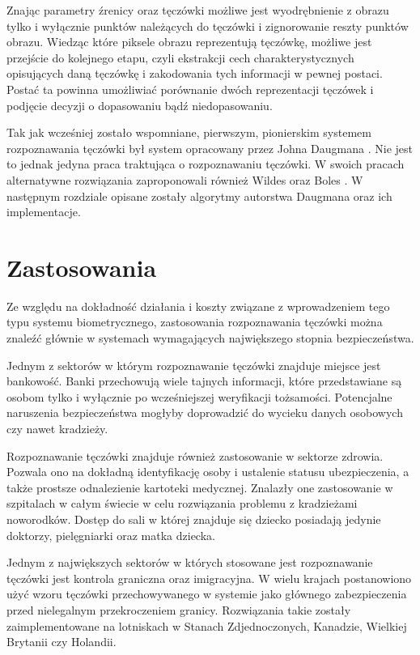 Znając parametry \'zrenicy oraz tęczówki możliwe jest wyodrębnienie z obrazu tylko i wyłącznie
punktów należących do tęczówki i zignorowanie reszty punktów obrazu. Wiedząc które piksele obrazu
reprezentują tęczówkę, możliwe jest przejście do kolejnego etapu, czyli ekstrakcji cech charakterystycznych
opisujących daną tęczówkę i zakodowania tych informacji w pewnej postaci. Posta\'c ta powinna umożliwia\'c
porównanie dwóch reprezentacji tęczówek i podjęcie decyzji o dopasowaniu bąd\'z niedopasowaniu.

Tak jak wcześniej zostało wspomniane, pierwszym, pionierskim systemem rozpoznawania tęczówki był
system opracowany przez Johna Daugmana \cite{DaugmanHowIrisRecognitionWorks}. Nie jest to jednak
jedyna praca traktująca o rozpoznawaniu tęczówki. W swoich pracach alternatywne rozwiązania
zaproponowali również Wildes \cite{Wildes} oraz Boles \cite{Boles}. W następnym rozdziale opisane
zostały algorytmy autorstwa Daugmana oraz ich implementacje.

\section{Zastosowania}

Ze względu na dokładnoś\'c działania i koszty związane z wprowadzeniem tego typu systemu
biometrycznego, zastosowania rozpoznawania tęczówki można znale\'z\'c głównie w systemach
wymagających największego stopnia bezpieczeństwa.

Jednym z sektorów w którym rozpoznawanie tęczówki znajduje miejsce jest bankowoś\'c. Banki
przechowują wiele tajnych informacji, które przedstawiane są osobom tylko i wyłącznie
po wcześniejszej weryfikacji tożsamości. Potencjalne naruszenia bezpieczeństwa mogłyby doprowadzi\'c
do wycieku danych osobowych czy nawet kradzieży.

Rozpoznawanie tęczówki znajduje również zastosowanie w sektorze zdrowia. Pozwala ono na dokładną
identyfikację osoby i ustalenie statusu ubezpieczenia, a także prostsze odnalezienie kartoteki
medycznej. Znalazły one zastosowanie w szpitalach w całym świecie w celu rozwiązania problemu z
kradzieżami noworodków. Dostęp do sali w której znajduje się dziecko posiadają jedynie doktorzy,
pielęgniarki oraz matka dziecka.

Jednym z największych sektorów w których stosowane jest rozpoznawanie tęczówki jest kontrola graniczna
oraz imigracyjna. W wielu krajach postanowiono uży\'c wzoru tęczówki przechowywanego w systemie jako głównego
zabezpieczenia przed nielegalnym przekroczeniem granicy. Rozwiązania takie zostały zaimplementowane na lotniskach
w Stanach Zdjednoczonych, Kanadzie, Wielkiej Brytanii czy Holandii.

